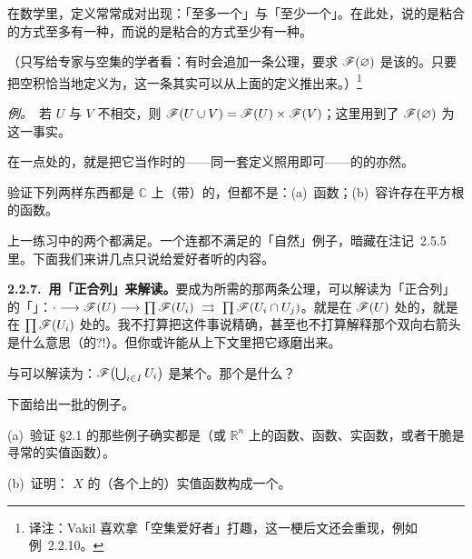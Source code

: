 在数学里，定义常常成对出现：「至多一个」与「至少一个」。在此处，\trIdentityAxiom{}说的是粘合的方式至多有一种，而\trGluability{}说的是粘合的方式至少有一种。

（只写给专家与空集的学者看：有时会追加一条公理，要求 $\mathscr{F}(\varnothing)$ 是该\trCategory{}的\trFinalObject{}。只要把空积恰当地定义为\trFinalObject{}，这一条其实可以从上面的定义推出来。）\footnote{译注：Vakil 喜欢拿「空集爱好者」打趣，这一梗后文还会重现，例如 \mbox{例~2.2.10}。}

\emph{例。}\ 若 $U$ 与 $V$ 不相交，则 $\mathscr{F}(U\cup V)=\mathscr{F}(U)\times\mathscr{F}(V)$；这里用到了 $\mathscr{F}(\varnothing)$ 为\trFinalObject{}这一事实。

\trSheaf{}在一点处的\textbf{\trStalk}，就是把它当作\trPresheaf{}时的\trStalk——同一套定义照用即可——\trSheaf{}的\trSection{}的\textbf{\trGerm}亦然。

\begin{exercise}\label{ex:presheaves-not-sheaves}
验证下列两样东西都是 $\mathbb{C}$ 上（带\trClassicalTopology）的\trPresheaf，但都不是\trSheaf：(a)~\trBounded{}函数；(b)~容许存在\trHolomorphic{}平方根的\trHolomorphic{}函数。
\end{exercise}

上一练习中的两个\trPresheaf{}都满足\trIdentityAxiom。一个连\trIdentityAxiom{}都不满足的「自然」例子，暗藏在\mbox{注记~2.5.5}里。下面我们来讲几点只说给\trCategory{}爱好者听的内容。

\textbf{2.2.7.\ 用「\trEqualizer{}正合列」来解读。}\quad \trPresheaf{}要成为\trSheaf{}所需的那两条公理，可以解读为「\trEqualizer{}正合列」的「\trExactness」：$\cdot\longrightarrow\scr{F}(U)\longrightarrow\prod\scr{F}(U_i)\ \rightrightarrows\ \prod\scr{F}(U_i\cap U_j)$。\trIdentityAxiom{}就是在 $\mathscr{F}(U)$ 处的\trExactness，\trGluability{}就是在 $\prod\mathscr{F}(U_i)$ 处的\trExactness。我不打算把这件事说精确，甚至也不打算解释那个双向右箭头是什么意思（\trSetsWord{}的\trExactSequence?!）。但你或许能从上下文里把它琢磨出来。

\begin{exercise}\label{ex:sheaf-axioms-as-limit}
\trIdentityAxiom{}与\trGluingAxiom{}可以解读为：$\mathscr{F}\bigl(\bigcup_{i\in I}U_i\bigr)$ 是某个\trLimit。那个\trLimit{}是什么？
\end{exercise}

下面给出一批\trSheaf{}的例子。

\begin{exercise}\label{ex:examples-are-sheaves}
(a)~验证 \S2.1 的那些例子确实都是\trSheaf（\trManifold{}或 $\mathbb{R}^n$ 上的\trSmooth{}函数、\trContinuous{}函数、实\trAnalytic{}函数，或者干脆是寻常的实值函数）。

(b)~证明：\trTopologicalSpace{} $X$ 的（各个\trOpenSet{}上的）实值\trContinuous{}函数构成一个\trSheaf。
\end{exercise}

